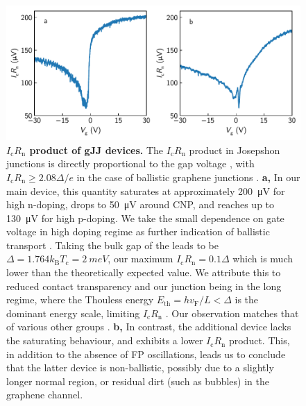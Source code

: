\begin{figure}[]
	\centering
	\includegraphics[width=\linewidth]{chapter-gJJ/figs/si_icrn}
	\caption{{\bf $I_\text{c} R_\text{n}$ product of gJJ devices.}
		The $I_\text{c} R_\text{n}$ product in Josepshon junctions is directly proportional to the gap voltage \cite{tinkham_introduction_1996}, with $I_\text{c} R_\text{n}\geq2.08\Delta/e$ in the case of ballistic graphene junctions \cite{titov_josephson_2006,cuevas_subharmonic_2006}.
		\textbf{a,} In our main device, this quantity saturates at approximately \SI{200}{\micro V} for high n-doping, drops to \SI{50}{\micro V} around CNP, and reaches up to \SI{130}{\micro V} for high p-doping.
		We take the small dependence on gate voltage in high doping regime as further indication of ballistic transport \cite{mizuno_ballisticlike_2013,zhu_supercurrent_2018}.
		Taking the bulk gap of the leads to be $\Delta=1.764 k_\text{B} T_\text{c} = \SI{2}{meV}$, our maximum $I_\text{c} R_\text{n}=0.1\Delta$ which is much lower than the theoretically expected value.
		We attribute this to reduced contact transparency and our junction being in the long regime, where the Thouless energy $E_\text{th}=hv_\text{F}/L < \Delta $ is the dominant energy scale, limiting $I_\text{c} R_\text{n}$ \cite{dubos_josephson_2001}.
		Our observation matches that of various other groups \cite{mizuno_ballisticlike_2013,benshalom_quantum_2015,borzenets_ballistic_2016a,zhu_supercurrent_2018}.
		\textbf{b,} In contrast, the additional device lacks the saturating behaviour, and exhibits a lower $I_\text{c}R_\text{n}$ product.
		This, in addition to the absence of FP oscillations, leads us to conclude that the latter device is non-ballistic, possibly due to a slightly longer normal region, or residual dirt (such as bubbles) in the graphene channel.
	}
	\label{fig:icrn}
\end{figure}


